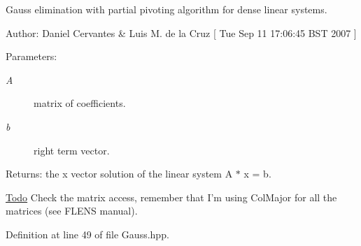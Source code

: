 Gauss elimination with partial pivoting algorithm for dense linear systems. 

\begin{Desc}
\item[Author:]Daniel Cervantes \& Luis M. de la Cruz \mbox{[} Tue Sep 11 17:06:45 BST 2007 \mbox{]} \end{Desc}
\begin{Desc}
\item[Parameters:]
\begin{description}
\item[{\em A}]matrix of coefficients. \item[{\em b}]right term vector. \end{description}
\end{Desc}
\begin{Desc}
\item[Returns:]the x vector solution of the linear system A $\ast$ x = b. \end{Desc}
\begin{Desc}
\item[\hyperlink{todo__todo000003}{Todo}]Check the matrix access, remember that I'm using ColMajor for all the matrices (see FLENS manual). \end{Desc}


Definition at line 49 of file Gauss.hpp.